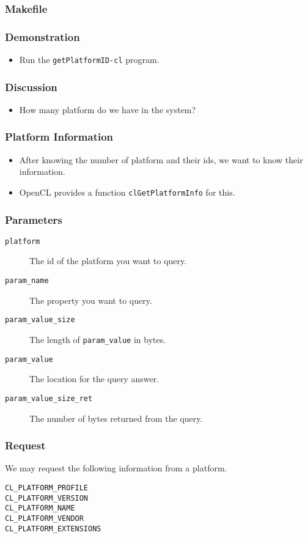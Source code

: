 \documentclass{beamer}
\begin{document}
\begin{frame}
  \frametitle{Makefile}
\end{frame}

\begin{frame}
  \frametitle{Demonstration}
  \begin{itemize}
  \item Run the {\tt getPlatformID-cl} program.
  \end{itemize}
\end{frame}

\begin{frame}
  \frametitle{Discussion}
  \begin{itemize}
  \item How many platform do we have in the system?
  \end{itemize}
\end{frame}

\begin{frame}
  \frametitle{Platform Information}
  \begin{itemize}
    \item After knowing the number of platform and their ids, we want
      to know their information.
    \item OpenCL provides a function {\tt clGetPlatformInfo} for this.
  \end{itemize}
\end{frame}

\begin{frame}
\end{frame}

\begin{frame}
  \frametitle{Parameters}
  \begin{description}
  \item [\tt platform] The id of the platform you want to query.
  \item [\tt param\_name] The property you want to query.
  \item [\tt param\_value\_size] The length of {\tt param\_value} in
    bytes.
  \item [\tt param\_value] The location for the query answer.
  \item [\tt param\_value\_size\_ret] The number of bytes returned
    from the query.
  \end{description}
\end{frame}

\begin{frame}
  \frametitle{Request}
  We may request the following information from a platform.
  \begin{description}
  \item[\tt CL\_PLATFORM\_PROFILE]
  \item[\tt CL\_PLATFORM\_VERSION]
  \item[\tt CL\_PLATFORM\_NAME]
  \item[\tt CL\_PLATFORM\_VENDOR]
  \item[\tt CL\_PLATFORM\_EXTENSIONS]
  \end{description}
\end{frame}
\end{document}
